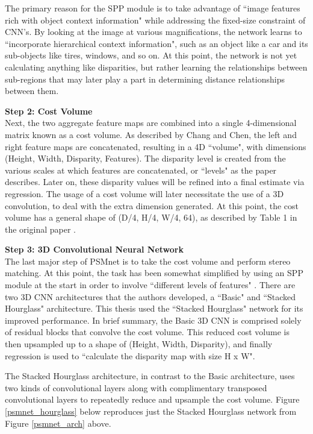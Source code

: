 The primary reason for the SPP module is to take advantage of ``image features rich with object context information" \cite{chang_pyramid_2018} while addressing the fixed-size constraint of CNN's. By looking at the image at various magnifications, the network learns to ``incorporate hierarchical context information", such as an object like a car and its sub-objects like tires, windows, and so on. At this point, the network is not yet calculating anything like disparities, but rather learning the relationships between sub-regions that may later play a part in determining distance relationships between them.

\textbf{{\large Step 2: Cost Volume}} \\
Next, the two aggregate feature maps are combined into a single 4-dimensional matrix known as a cost volume. As described by Chang and Chen, the left and right feature maps are concatenated, resulting in a 4D ``volume", with dimensions (Height, Width, Disparity, Features). The disparity level is created from the various scales at which features are concatenated, or ``levels" as the paper describes. Later on, these disparity values will be refined into a final estimate via regression. The usage of a cost volume will later necessitate the use of a 3D convolution, to deal with the extra dimension generated. At this point, the cost volume has a general shape of (D/4, H/4, W/4, 64), as described by Table 1 in the original paper \cite{chang_pyramid_2018}.

\textbf{{\large Step 3: 3D Convolutional Neural Network}} \\
The last major step of PSMnet is to take the cost volume and perform stereo matching. At this point, the task has been somewhat simplified by using an SPP module at the start in order to involve ``different levels of features" \cite{chang_pyramid_2018}. There are two 3D CNN architectures that the authors developed, a ``Basic" and ``Stacked Hourglass" architecture. This thesis used the ``Stacked Hourglass" network for its improved performance. In brief summary, the Basic 3D CNN is comprised solely of residual blocks that convolve the cost volume. This reduced cost volume is then upsampled up to a shape of (Height, Width, Disparity), and finally regression is used to ``calculate the disparity map with size H x W".

The Stacked Hourglass architecture, in contrast to the Basic architecture, uses two kinds of convolutional layers along with complimentary transposed convolutional layers to repeatedly reduce and upsample the cost volume. Figure \ref{psmnet_hourglass} below reproduces just the Stacked Hourglass network from Figure \ref{psmnet_arch} above. 


